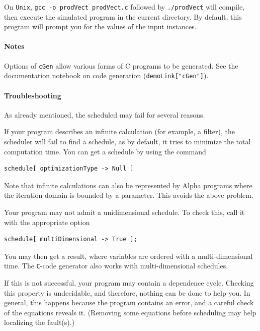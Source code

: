 \documentclass[12pt]{article}
\newcommand{\C}{\texttt{C}}
\newcommand{\Alpha}{{\sc Alpha}}
\newcommand{\alfa}{\Alpha}
\begin{document}
On \texttt{Unix}, \texttt{gcc -o prodVect prodVect.c} followed by
\texttt{./prodVect} will compile, then execute the simulated
program in the current directory. By default, this program 
will prompt you for the values of the input instances. 

\paragraph*{Notes}
Options of \texttt{cGen} allow various forms of C programs 
to be generated. See the documentation notebook on 
code generation (\texttt{demoLink["cGen"]}).

\paragraph*{Troubleshooting}
\label{tssim}
As already mentioned, the scheduled may fail for several 
reasons.

If your program describes an infinite calculation (for
example, a filter), the scheduler will fail to find 
a schedule, as by default, it tries to minimize the total
computation time. You can get a schedule by using the
command
\begin{verbatim}
schedule[ optimizationType -> Null ]
\end{verbatim}
Note that infinite calculations can also be represented
by \alfa{} programs where the iteration domain is bounded by
a parameter. This avoids the above problem. 

Your program may not admit a unidimensional schedule. 
To check this, call it with the appropriate option 
\begin{verbatim}
schedule[ multiDimensional -> True ];
\end{verbatim}
You may then get a result, where variables are ordered
with a multi-dimensional time. The \C{}-code generator
also works with multi-dimensional schedules. 

If this is not successful, 
your program may contain a dependence cycle. 
Checking this property is undecidable, and therefore, 
nothing can be done to help you. In general, this happens
because the program contains an error, and a careful check 
of the equations reveals it. (Removing some equations before
scheduling may help 
localizing the fault(s).)
\end{document}
